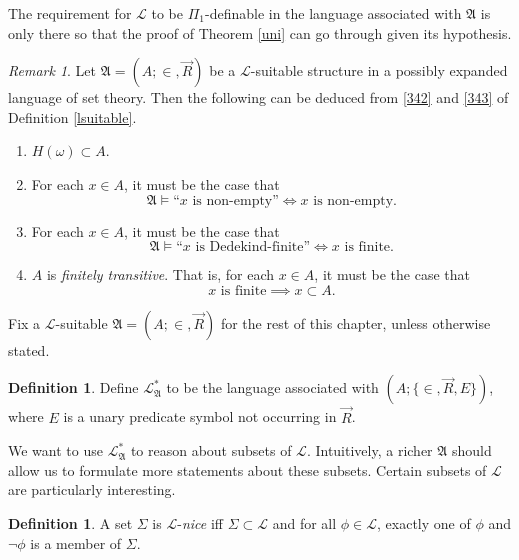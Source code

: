 \documentclass[12pt, twoside]{memoir}
\numberwithin{equation}{section}
\theoremstyle{definition}
\newtheorem{defi}[thm]{Definition}
\theoremstyle{remark}
\newtheorem{rem}[thm]{Remark}
\theoremstyle{definition}
\theoremstyle{definition}
\theoremstyle{definition}
\theoremstyle{remark}
\begin{document}
The requirement for $\mathcal{L}$ to be $\Pi_1$-definable in the language associated with $\mathfrak{A}$ is only there so that the proof of Theorem \ref{uni} can go through given its hypothesis.

\begin{rem}\label{rem35}
Let $\mathfrak{A} = (A; \in, \Vec{R})$ be a $\mathcal{L}$-suitable structure in a possibly expanded language of set theory. Then the following can be deduced from \ref{342} and \ref{343} of Definition \ref{lsuitable}.
\begin{enumerate}[label=(\arabic*)]
    \item\label{351} $H(\omega) \subset A$.
    \item\label{352} For each $x \in A$, it must be the case that
    \begin{equation*}
        \mathfrak{A} \models \text{``} x \text{ is non-empty''} \iff x \text{ is non-empty.}
    \end{equation*}
    \item\label{353} For each $x \in A$, it must be the case that
    \begin{equation*}
        \mathfrak{A} \models \text{``} x \text{ is Dedekind-finite''} \iff x \text{ is finite.}
    \end{equation*}
    \item\label{354} $A$ is \emph{finitely transitive}. That is, for each $x \in A$, it must be the case that
    \begin{equation*}
        x \text{ is finite} \implies x \subset A \text{.}
    \end{equation*}
\end{enumerate}
\end{rem}

Fix a $\mathcal{L}$-suitable $\mathfrak{A} = (A; \in, \Vec{R})$ for the rest of this chapter, unless otherwise stated.

\begin{defi}
Define $\mathcal{L}^{*}_{\mathfrak{A}}$ to be the language associated with $(A; \{\in, \Vec{R}, E\})$, where $E$ is a unary predicate symbol not occurring in $\Vec{R}$. 
\end{defi}

We want to use $\mathcal{L}^{*}_{\mathfrak{A}}$ to reason about subsets of $\mathcal{L}$. Intuitively, a richer $\mathfrak{A}$ should allow us to formulate more statements about these subsets. Certain subsets of $\mathcal{L}$ are particularly interesting.

\begin{defi}\label{lnice}
A set $\Sigma$ is $\mathcal{L}$-\emph{nice} iff $\Sigma \subset \mathcal{L}$ and for all $\phi \in \mathcal{L}$, exactly one of $\phi$ and $\neg \phi$ is a member of $\Sigma$.
\end{defi}
\end{document}
